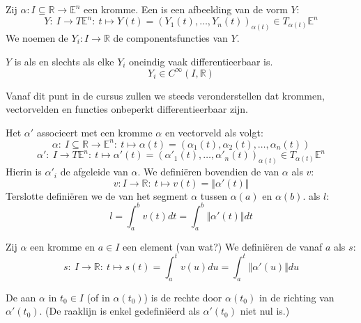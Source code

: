 \documentclass[main.tex]{subfiles}
\begin{document}
\begin{de}
  Zij $\alpha: I \subseteq \mathbb{R} \rightarrow \mathbb{E}^{n}$ een kromme.
  Een  is een afbeelding van de vorm $Y$:
  \[ Y:\ I \rightarrow T\mathbb{E}^{n}:\ t\mapsto Y(t) = (Y_{1}(t),\dotsc,Y_{n}(t))_{\alpha(t)} \in T_{\alpha(t)}\mathbb{E}^{n} \]
  We noemen de $Y_{i}: I \rightarrow \mathbb{R}$ de componentsfuncties van $Y$.
\end{de}

\begin{de}
  $Y$ is  als en slechts als elke $Y_{i}$ oneindig vaak differentieerbaar is.
  \[ Y_{i} \in C^{\infty}(I,\mathbb{R}) \]
\end{de}

\begin{opm}
  Vanaf dit punt in de cursus zullen we steeds veronderstellen dat krommen, vectorvelden en functies onbeperkt differentieerbaar zijn.
\end{opm}

\begin{de}
  Het  $\alpha'$ associeert met een kromme $\alpha$ en vectorveld als volgt:
  \[ \alpha:\ I \subseteq \mathbb{R} \rightarrow \mathbb{E}^{n}:\ t \mapsto \alpha(t) = (\alpha_{1}(t), \alpha_{2}(t), \dotsc, \alpha_{n}(t)) \]
  \[ \alpha':\ I \rightarrow T\mathbb{E}^{n}:\ t\mapsto \alpha'(t) = (\alpha'_{1}(t),\dotsc,\alpha'_{n}(t))_{\alpha(t)} \in T_{\alpha(t)}\mathbb{E}^{n} \]
  Hierin is $\alpha'_{i}$ de afgeleide van $\alpha$.
  We defini\"eren bovendien de  van $\alpha$ als $v$:
  \[ v: I \rightarrow \mathbb{R}:\ t \mapsto v(t) = \Vert \alpha'(t) \Vert \]
  Terslotte defini\"eren we de  van het segment $\alpha$ tussen $\alpha(a)$ en $\alpha(b)$. als $l$:
  \[ l = \int_{a}^{b}v(t)dt = \int_{a}^{b}\Vert \alpha'(t) \Vert dt \]
\end{de}

\begin{de}
  Zij $\alpha$ een kromme en $a\in I$ een element (van wat?)
  We defini\"eren de  vanaf $a$ als $s$:
  \[ s:\ I \rightarrow \mathbb{R}:\ t \mapsto s(t) = \int_{a}^{t}v(u)du = \int_{a}^{t}\Vert \alpha'(u) \Vert du  \]
\end{de}

\begin{de}
  De  aan $\alpha$ in $t_{0}\in I$ (of in $\alpha(t_{0})$) is de rechte door $\alpha(t_{0})$ in de richting van $\alpha'(t_{0})$.
  (De raaklijn is enkel gedefini\"eerd als $\alpha'(t_{0})$ niet nul is.)
\end{de}
\end{document}
